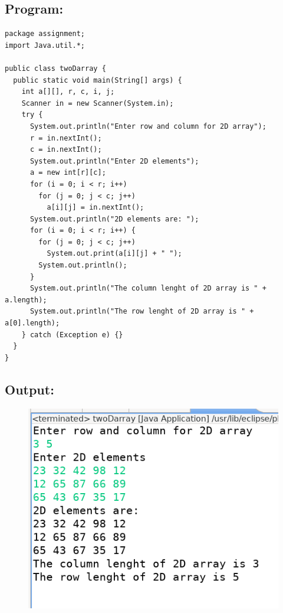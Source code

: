 \documentclass[12pt, a4paper]{article}
\begin{document}
\subsection*{Program:}
\begin{lstlisting}
package assignment;
import Java.util.*;

public class twoDarray {
  public static void main(String[] args) {
    int a[][], r, c, i, j;
    Scanner in = new Scanner(System.in);
    try {
      System.out.println("Enter row and column for 2D array");
      r = in.nextInt();
      c = in.nextInt();
      System.out.println("Enter 2D elements");
      a = new int[r][c];
      for (i = 0; i < r; i++)
        for (j = 0; j < c; j++)
          a[i][j] = in.nextInt();
      System.out.println("2D elements are: ");
      for (i = 0; i < r; i++) {
        for (j = 0; j < c; j++)
          System.out.print(a[i][j] + " ");
        System.out.println();
      }
      System.out.println("The column lenght of 2D array is " + a.length);
      System.out.println("The row lenght of 2D array is " + a[0].length);
    } catch (Exception e) {}
  }
}
\end{lstlisting}

\subsection*{Output:}
\begin{figure}[h]
  \centering
  \includegraphics[width=\textwidth]{twoDarray}
\end{figure}
\newpage
\end{document}
